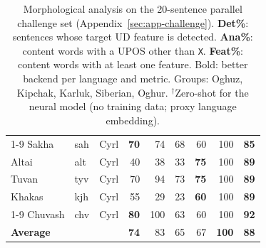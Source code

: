 \begin{table}[t]
\begin{tabular}{@{}ll l  rrr  rrr@{}}
    \cmidrule(lr){1-9}
    Sakha            & sah & Cyrl &  \textbf{70} &  74 &  68 &  60 & 100 & \textbf{85} \\
    Altai            & alt & Cyrl &   40 &  38 &  33 & \textbf{75} & 100 & \textbf{89} \\
    Tuvan            & tyv & Cyrl &   70 &  94 &  73 & \textbf{75} & 100 & \textbf{89} \\
    Khakas           & kjh & Cyrl &   55 &  29 &  23 & \textbf{60} & 100 & \textbf{89} \\
    \cmidrule(lr){1-9}
    Chuvash          & chv & Cyrl &  \textbf{80} & 100 &  63 &  60 & 100 & \textbf{92} \\
    \midrule
    \textbf{Average} & & &  \textbf{74} &  83 &  65 &  67 &  \textbf{100} &  \textbf{88} \\
    \bottomrule
  \end{tabular}
  \caption{Morphological analysis on the 20-sentence parallel challenge set (Appendix~\ref{sec:app-challenge}). \textbf{Det\%}: sentences whose target UD feature is detected. \textbf{Ana\%}: content words with a UPOS other than \texttt{X}. \textbf{Feat\%}: content words with at least one feature. Bold: better backend per language and metric. Groups: Oghuz, Kipchak, Karluk, Siberian, Oghur. $^\dagger$Zero-shot for the neural model (no training data; proxy language embedding).}
  \label{tab:morph-eval}
\end{table}
